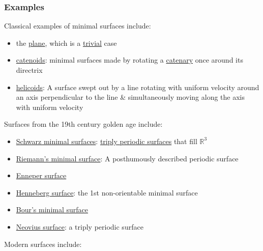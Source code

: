 \documentclass{article}
\begin{document}
\subsubsection{Examples}
Classical examples of minimal surfaces include:
\begin{itemize}
	\item the \href{https://en.wikipedia.org/wiki/Plane_(geometry)}{plane}, which is a \href{https://en.wikipedia.org/wiki/Trivial_(mathematics)}{trivial} case
	\item \href{https://en.wikipedia.org/wiki/Catenoid}{catenoids}: minimal surfaces made by rotating a \href{https://en.wikipedia.org/wiki/Catenary}{catenary} once around its directrix
	\item \href{https://en.wikipedia.org/wiki/Helicoid}{helicoids}: A surface swept out by a line rotating with uniform velocity around an axis perpendicular to the line \& simultaneously moving along the axis with uniform velocity
\end{itemize}
Surfaces from the 19th century golden age include:
\begin{itemize}
	\item \href{https://en.wikipedia.org/wiki/Schwarz_minimal_surface}{Schwarz minimal surfaces}: \href{https://en.wikipedia.org/wiki/Triply_periodic_minimal_surface}{triply periodic surfaces} that fill $\mathbb{R}^3$
	\item \href{https://en.wikipedia.org/wiki/Riemann%27s_minimal_surface}{Riemann's minimal surface}: A posthumously described periodic surface
	\item \href{https://en.wikipedia.org/wiki/Enneper_surface}{Enneper surface}
	\item \href{https://en.wikipedia.org/wiki/Henneberg_surface}{Henneberg surface}: the 1st non-orientable minimal surface
	\item \href{https://en.wikipedia.org/wiki/Bour%27s_minimal_surface}{Bour's minimal surface}
	\item \href{https://en.wikipedia.org/wiki/Neovius_surface}{Neovius surface}: a triply periodic surface
\end{itemize}
Modern surfaces include:
\end{document}
